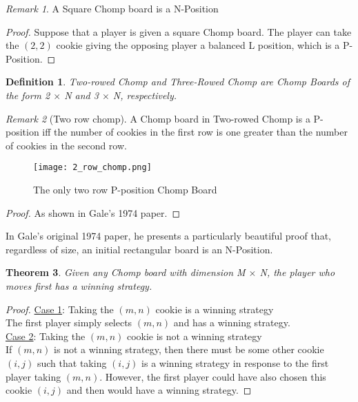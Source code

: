 \documentclass{amsart}
\newtheorem{thm}{Theorem}
\newtheorem{term}{Definition} %
\theoremstyle{definition}
\theoremstyle{remark}
\newtheorem{rem}[thm]{Remark}
\numberwithin{equation}{section}
\begin{document}
\begin{rem}
A Square Chomp board is a N-Position
\end{rem}
\begin{proof}
Suppose that a player is given a square Chomp board. The player can take the $(2,2)$ cookie giving the opposing player a balanced L position, which is a P-Position.
\end{proof}

\begin{term}
Two-rowed Chomp and Three-Rowed Chomp are Chomp Boards of the form 2 $\times$ N and 3 $\times$ N, respectively.
\end{term}

\begin{rem}[Two row chomp]
A Chomp board in Two-rowed Chomp is a P-position iff the number of cookies in the first row is one greater than the number of cookies in the second row.
\end{rem}
\begin{figure}[2row]
\texttt{[image: 2\_row\_chomp.png]}
\caption{The only two row P-position Chomp Board}
\end{figure}
\begin{proof}
As shown in Gale's 1974 paper.\cite{Gale74}
\end{proof}



\noindent In Gale's original 1974 paper, he presents a particularly beautiful proof that, regardless of size, an initial rectangular board is an N-Position.

\begin{thm}
\label{stealing}
Given any Chomp board with dimension M $\times$ N, the player who moves first has a winning strategy.
\end{thm}
\begin{proof} \hfill \break
\underline{Case 1}: Taking the $(m,n)$ cookie is a winning strategy\\ 
The first player simply selects $(m,n)$ and has a winning strategy.\\
\underline{Case 2}: Taking the $(m,n)$ cookie is not a winning strategy\\
If $(m,n)$ is not a winning strategy, then there must be some other cookie $(i,j)$ such that taking $(i,j)$ is a winning strategy in response to the first player taking $(m,n)$. However, the first player could have also chosen this cookie $(i,j)$ and then would have a winning strategy.
\end{proof}
\end{document}
